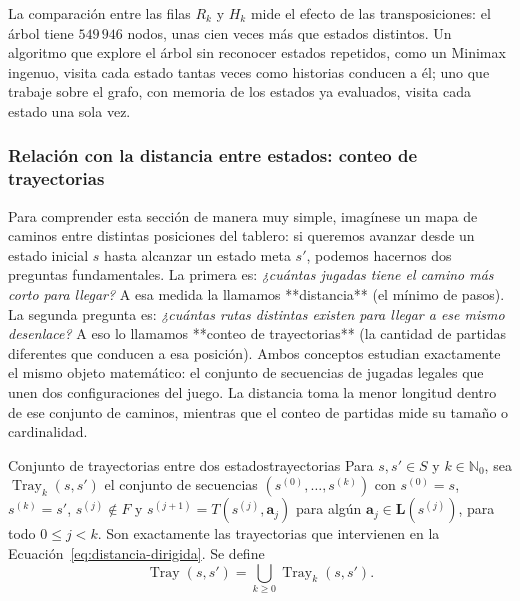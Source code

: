 La comparación entre las filas $R_k$ y $H_k$ mide el efecto de las transposiciones: el árbol tiene $549\,946$ nodos, unas cien veces más que estados distintos. Un algoritmo que explore el árbol sin reconocer estados repetidos, como un Minimax ingenuo, visita cada estado tantas veces como historias conducen a él; uno que trabaje sobre el grafo, con memoria de los estados ya evaluados, visita cada estado una sola vez.

\subsubsection{Relación con la distancia entre estados: conteo de trayectorias}
\label{subsubsec:an_trayectorias}

Para comprender esta sección de manera muy simple, imagínese un mapa de caminos entre distintas posiciones del tablero: si queremos avanzar desde un estado inicial $s$ hasta alcanzar un estado meta $s'$, podemos hacernos dos preguntas fundamentales. La primera es: \emph{¿cuántas jugadas tiene el camino más corto para llegar?} A esa medida la llamamos **distancia** (el mínimo de pasos). La segunda pregunta es: \emph{¿cuántas rutas distintas existen para llegar a ese mismo desenlace?} A eso lo llamamos **conteo de trayectorias** (la cantidad de partidas diferentes que conducen a esa posición). Ambos conceptos estudian exactamente el mismo objeto matemático: el conjunto de secuencias de jugadas legales que unen dos configuraciones del juego. La distancia toma la menor longitud dentro de ese conjunto de caminos, mientras que el conteo de partidas mide su tamaño o cardinalidad.

\begin{definicion}{Conjunto de trayectorias entre dos estados}{trayectorias}
Para $s, s' \in S$ y $k \in \mathbb N_0$, sea $\operatorname{Tray}_k(s, s')$ el conjunto de secuencias $(s^{(0)}, \dots, s^{(k)})$ con $s^{(0)} = s$, $s^{(k)} = s'$, $s^{(j)} \notin F$ y $s^{(j+1)} = T(s^{(j)}, \mathbf a_j)$ para algún $\mathbf a_j \in \mathbf L(s^{(j)})$, para todo $0 \le j < k$. Son exactamente las trayectorias que intervienen en la Ecuación~\eqref{eq:distancia-dirigida}. Se define
\begin{equation}
    \operatorname{Tray}(s, s') = \bigcup_{k \ge 0} \operatorname{Tray}_k(s, s').
    \label{eq:an_tray}
\end{equation}
\end{definicion}

